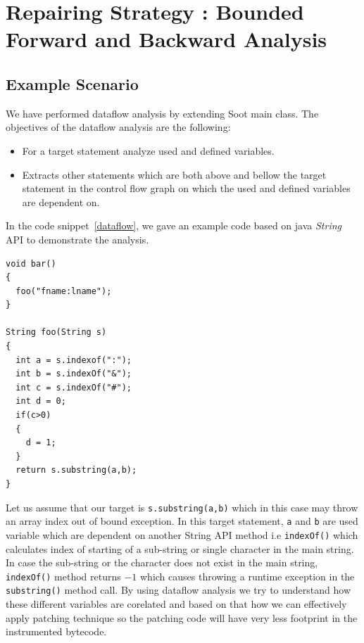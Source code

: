 

\chapter{Repairing Strategy : Bounded Forward and Backward Analysis}
\label{chapter:boundedAnalysis}


\section{Example Scenario}
\label{exampleScenario}

We have performed dataflow analysis by extending Soot main class. The objectives
of the dataflow analysis are the following:

\begin{itemize}
  \item For a target statement analyze used and defined variables.
  
  \item Extracts other statements which are both above and bellow the target
  statement in the control flow graph on which the used and defined variables
  are dependent on.
  
\end{itemize}

In the code snippet~\ref{dataflow}, we gave an example code based on java
\emph{String} API to demonstrate the analysis.

\onehalfspacing
\lstset{language=Java, caption=Dataflow analysis,
label=dataflow}
\begin{lstlisting}
void bar()
{
  foo("fname:lname");
}

String foo(String s)
{
  int a = s.indexof(":");
  int b = s.indexOf("&");
  int c = s.indexOf("#");
  int d = 0;
  if(c>0)
  {
    d = 1;
  }
  return s.substring(a,b);
}

\end{lstlisting}

Let us assume that our target is \texttt{s.substring(a,b)} which in this case
may throw an array index out of bound exception. In this target statement,
\texttt{a} and \texttt{b} are used variable which are dependent on another
String API method i.e \texttt{indexOf()} which calculates index of starting of a
sub-string or single character in the main string. In case the sub-string or the
character does not exist in the main string, \texttt{indexOf()} method returns
$-1$ which causes throwing a runtime exception in the \texttt{substring()}
method call.
\newline
By using dataflow analysis we try to understand how these different variables
are corelated and based on that how we can effectively apply patching technique
so the patching code will have very less footprint in the instrumented bytecode.

